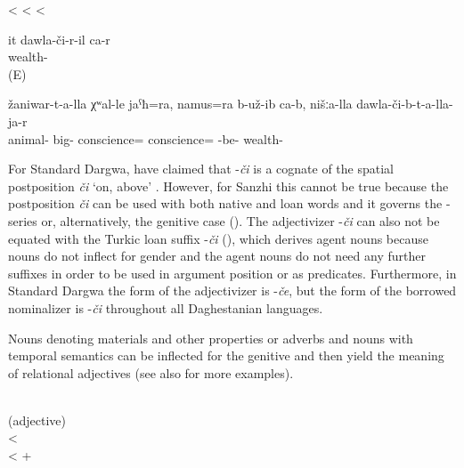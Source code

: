 \begin{exe}
	\ex	\label{ex:adjectivesWithCHIB_1}
	\begin{xlist}
		\TabPositions{10em,12em}
		\ex	{}  		\tab	<	\tab	{} 
		\ex	{}   \tab	<	\tab	{} 
		\ex	{}   \tab	<	\tab	{} 
	\end{xlist}

	\ex	\label{ex:She is rich}
	\gll	it dawla-či-r-il ca-r \\
			wealth-	 \\
	\glt	{} (E)
	
	\ex	\label{The animals had apparently more consciences thatn our rich (people).}
	\gll žaniwar-t-a-lla				χʷal-le		jaˁħ=ra,	namus=ra		b-už-ib ca-b,	nišːa-lla		dawla-či-b-t-a-lla-ja-r \\
	animal-	big-	conscience=		conscience=	-be-				wealth- \\
	\glt	{}
	
\end{exe}

For Standard Dargwa, \citealp[212]{Abdullaev2014} have claimed that -\textit{či} is a cognate of the spatial postposition \textit{či} `on, above' . However, for Sanzhi this cannot be true because the postposition \textit{či} can be used with both native and loan words and it governs the -series or, alternatively, the genitive case (). The adjectivizer -\textit{či} can also not be equated with the Turkic loan suffix -\textit{či} (), which derives agent nouns because nouns do not inflect for gender and the agent nouns do not need any further suffixes in order to be used in argument position or as predicates. Furthermore, in Standard Dargwa the form of the adjectivizer is -\textit{če}, but the form of the borrowed nominalizer is -\textit{či} throughout all Daghestanian languages.

Nouns denoting materials and other properties or adverbs and nouns with temporal semantics can be inflected for the genitive and then yield the meaning of relational adjectives  (see also  for more examples).
%
\begin{exe}
\ex	\label{ex:adjectivesWithLA}
		\TabPositions{12em}
		 		\tab	{}	 \\
		 				\tab	{}  (adjective)\\
		  <  \\
						<	   +   
\end{exe}


